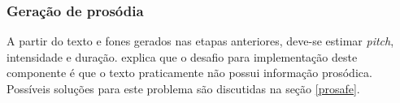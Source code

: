 \subsubsection{Geração de prosódia}
\label{gerpros}
A partir do texto e fones gerados nas etapas anteriores, deve-se estimar
\emph{pitch}, intensidade e duração.  explica que o
desafio para implementação deste componente é que o texto praticamente não
possui informação prosódica. Possíveis soluções para este problema são discutidas na seção \ref{prosafe}.




